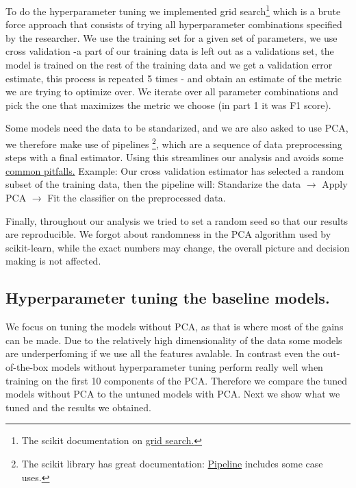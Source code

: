 \documentclass{article}
\begin{document}
To do the hyperparameter tuning we implemented grid search\footnote{The scikit documentation on \href{https://scikit-learn.org/1.5/modules/grid_search.html}{grid search.}
} which is a brute force approach that consists of trying all hyperparameter combinations specified by the researcher. 
We use the training set for a given set of parameters, we use cross validation -a part of our training data is left out as a validations set, the model is trained on the rest of the training data and we get a validation error estimate, this process is repeated 5 times - and obtain an estimate of the metric we are trying to optimize over.
We iterate over all parameter combinations and pick the one that maximizes the metric we choose (in part 1 it was F1 score).

Some models need the data to be standarized, and we are also asked to use PCA, we therefore make use of pipelines \footnote{The scikit library has great documentation:
\href{https://scikit-learn.org/stable/modules/generated/sklearn.pipeline.Pipeline.html}{Pipeline} includes some case uses.}, which are a sequence of data preprocessing steps with a final estimator. Using this 
streamlines our analysis and avoids some \href{https://scikit-learn.org/stable/common_pitfalls.html}{common pitfalls.}
Example: Our cross validation estimator has selected a random subset of the training data, then the pipeline will: Standarize the data $\rightarrow$ Apply PCA $\rightarrow$ Fit the classifier on the preprocessed data.

Finally, throughout our analysis we tried to set a random seed so that our results are reproducible. We forgot about randomness in the PCA algorithm used by scikit-learn, while the exact numbers may change, the overall picture and decision making is not affected.

\subsection{Hyperparameter tuning the baseline models.}
We focus on tuning the models without PCA, as that is where most of the gains can be made. Due to the relatively high dimensionality of the
data some models are underperfoming if we use all the features avalable. In contrast even the out-of-the-box models without hyperparameter tuning 
perform really well when training on the first 10 components of the PCA. Therefore we compare the tuned models without PCA to the untuned models with PCA. 
Next we show what we tuned and the results we obtained.
\end{document}
